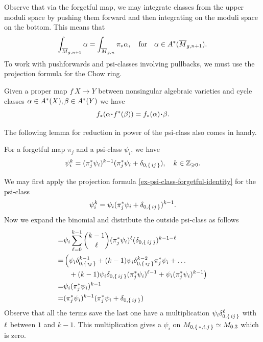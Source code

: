 \documentclass[12pt]{memoir}
\begin{document}
Observe that via the forgetful map, we may integrate classes from the upper moduli space by pushing them forward and then integrating on the moduli space on the bottom. This means that
$$\int_{\overline{M}_{g,n+1}}\alpha=\int_{\overline{M}_{g,n}}\pi_\ast\alpha,\quad\text{for}\quad\alpha\in A^\ast(\overline M_{g,n+1}).$$
To work with pushforwards and psi-classes involving pullbacks, we must use the projection formula for the Chow ring. 

\begin{Prop}
    Given a proper map $f\: X\to Y$ between nonsingular algebraic varieties and cycle classes $\alpha\in A^\ast(X),\beta\in A^\ast(Y)$ we have
    $$f_\ast(\al\.f^\ast(\bt))=f_\ast(\al)\.\bt.$$
\end{Prop}

The following lemma for reduction in power of the psi-class also comes in handy.

\begin{Lem}
For a forgetful map $\pi_j$ and a psi-class $\psi_i$, we have 
$$\psi_i^k=(\pi_j^\ast\psi_i)^{k-1}(\pi_j^\ast\psi_i+\delta_{0,\{\,ij\,\}}),\quad k\in\mathbb{Z}_{\geqslant 0}.$$
\end{Lem}

\begin{ptcbp}
    We may first apply the projection formula \ref{ex-psi-class-forgetful-identity} for the psi-class
    $$\psi_i^k=\psi_i(\pi_j^\ast\psi_i+\delta_{0,\{\,ij\,\}})^{k-1}.$$
    Now we expand the binomial and distribute the outside psi-class as follows 
    \begin{align*}
        =&\psi_i\sum_{\ell=0}^{k-1}\binom{k-1}{\ell}(\pi_j^\ast\psi_i)^\ell(\delta_{0,\{\,ij\,\}})^{k-1-\ell}\\
        =&\left(\psi_i\delta_{0,\{\,ij\,\}}^{k-1}+(k-1){\psi_i}\delta_{0,\{\,ij\,\}}^{k-2}\pi_j^\ast\psi_i+\dots\right.\\
        &\left.\phantom{\left(\right.}+(k-1)\psi_i\delta_{0,\{\,ij\,\}}(\pi_j^\ast\psi_i)^{\ell-1}+\psi_i(\pi_j^\ast\psi_i)^{k-1}\right)\\
        =&\psi_i(\pi_j^\ast\psi_i)^{k-1}\\
        =&(\pi_j^\ast\psi_i)^{k-1}(\pi_j^\ast\psi_i+\delta_{0,\{\,ij\,\}})
    \end{align*}
    Observe that all the terms save the last one have a multiplication $\psi_i\delta_{0,\{\,ij\,\}}^{\ell}$ with $\ell$ between $1$ and $k-1$. This multiplication gives a $\psi_i$ on $M_{0,\{\,\ast,i,j\,\}}\simeq M_{0,3}$ which is zero.  
\end{ptcbp}
\end{document}

